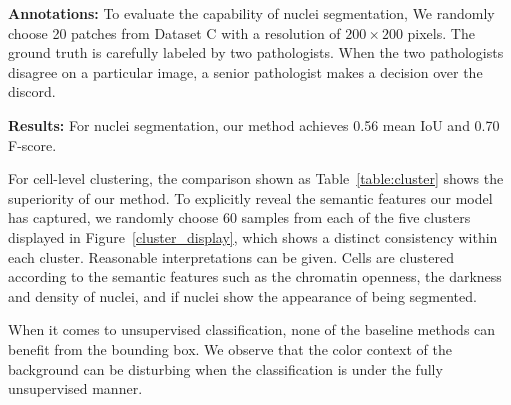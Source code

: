 \documentclass[journal]{IEEEtran}
\begin{document}
\textbf{Annotations:} To evaluate the capability of nuclei segmentation, We randomly choose 20 patches from Dataset C with a resolution of $200 \times 200$ pixels. The ground truth is carefully labeled by two pathologists. When the two pathologists disagree on a particular image, a senior pathologist makes a decision over the discord. 

\textbf{Results:} For nuclei segmentation, our method achieves 0.56 mean IoU and 0.70 F-score. 

For cell-level clustering, the comparison shown as Table~\ref{table:cluster} shows the superiority of our method. To explicitly reveal the semantic features our model has captured, we randomly choose 60 samples from each of the five clusters displayed in Figure~\ref{cluster_display}, which shows a distinct consistency within each cluster. Reasonable interpretations can be given. Cells are clustered according to the semantic features such as the chromatin openness, the darkness and density of nuclei, and if nuclei show the appearance of being segmented.

{When it comes to unsupervised classification, none of the baseline methods can benefit from the bounding box. We observe that the color context of the background can be disturbing when the classification is under the fully unsupervised manner.}
\end{document}
